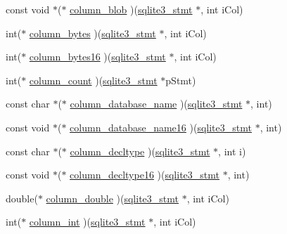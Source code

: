 \begin{DoxyCompactItemize}
\item 
const void $\ast$($\ast$ \hyperlink{structsqlite3__api__routines_afd0e3c2c6e6eb5000317676b71434ed0}{column\+\_\+blob} )(\hyperlink{sqlite3_8c_af2a033da1327cdd77f0a174a09aedd0c}{sqlite3\+\_\+stmt} $\ast$, int i\+Col)
\item 
int($\ast$ \hyperlink{structsqlite3__api__routines_ae1fab582ffc2298db1a581c5dd0600a9}{column\+\_\+bytes} )(\hyperlink{sqlite3_8c_af2a033da1327cdd77f0a174a09aedd0c}{sqlite3\+\_\+stmt} $\ast$, int i\+Col)
\item 
int($\ast$ \hyperlink{structsqlite3__api__routines_a219edb83765e8077a8ccc1f24f20aa99}{column\+\_\+bytes16} )(\hyperlink{sqlite3_8c_af2a033da1327cdd77f0a174a09aedd0c}{sqlite3\+\_\+stmt} $\ast$, int i\+Col)
\item 
int($\ast$ \hyperlink{structsqlite3__api__routines_a520b006b5146d066933c2fcea314366e}{column\+\_\+count} )(\hyperlink{sqlite3_8c_af2a033da1327cdd77f0a174a09aedd0c}{sqlite3\+\_\+stmt} $\ast$p\+Stmt)
\item 
const char $\ast$($\ast$ \hyperlink{structsqlite3__api__routines_a18d0b5a6a6a10404c348b987f328127c}{column\+\_\+database\+\_\+name} )(\hyperlink{sqlite3_8c_af2a033da1327cdd77f0a174a09aedd0c}{sqlite3\+\_\+stmt} $\ast$, int)
\item 
const void $\ast$($\ast$ \hyperlink{structsqlite3__api__routines_a985c0731ddd0bafff880747a307a43d9}{column\+\_\+database\+\_\+name16} )(\hyperlink{sqlite3_8c_af2a033da1327cdd77f0a174a09aedd0c}{sqlite3\+\_\+stmt} $\ast$, int)
\item 
const char $\ast$($\ast$ \hyperlink{structsqlite3__api__routines_ae97b4b0b98a715c66528a87e57160c1e}{column\+\_\+decltype} )(\hyperlink{sqlite3_8c_af2a033da1327cdd77f0a174a09aedd0c}{sqlite3\+\_\+stmt} $\ast$, int i)
\item 
const void $\ast$($\ast$ \hyperlink{structsqlite3__api__routines_aa852f9a24c9f0503ae4ba31bbc853fcc}{column\+\_\+decltype16} )(\hyperlink{sqlite3_8c_af2a033da1327cdd77f0a174a09aedd0c}{sqlite3\+\_\+stmt} $\ast$, int)
\item 
double($\ast$ \hyperlink{structsqlite3__api__routines_aa17d48cd9e1033459492792eea5b58e0}{column\+\_\+double} )(\hyperlink{sqlite3_8c_af2a033da1327cdd77f0a174a09aedd0c}{sqlite3\+\_\+stmt} $\ast$, int i\+Col)
\item 
int($\ast$ \hyperlink{structsqlite3__api__routines_ab905e24ea0a592436e42d95a9ccf5a66}{column\+\_\+int} )(\hyperlink{sqlite3_8c_af2a033da1327cdd77f0a174a09aedd0c}{sqlite3\+\_\+stmt} $\ast$, int i\+Col)
\item 

\end{DoxyCompactItemize}
